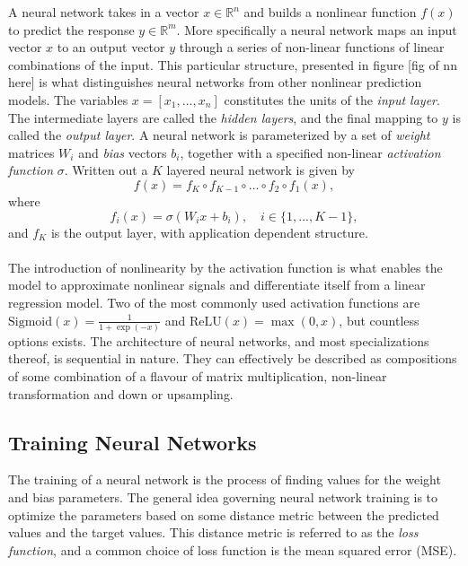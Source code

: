\documentclass[../../thesis.tex]{subfiles}
\begin{document}
A neural network takes in a vector $x \in \mathbb{R}^n$ and builds a nonlinear function $f(x)$ to predict the response $y\in \mathbb{R}^m$. More specifically a neural network maps an input vector $x$ to an output vector $y$ through a series of non-linear functions of linear combinations of the input. This particular structure, presented in figure [fig of nn here] is what distinguishes neural networks from other nonlinear prediction models. The variables $x = [x_1,...,x_n]$ constitutes the units of the \textit{input layer}. The intermediate layers are called the \textit{hidden layers}, and the final mapping to $y$ is called the \textit{output layer}. A neural network is parameterized by a set of \textit{weight} matrices $W_i$ and \textit{bias} vectors $b_i$, together with a specified non-linear \textit{activation function} $\sigma$. Written out a $K$ layered neural network is given by 
\[ 
f(x) = f_K \circ f_{K-1} \circ \ldots \circ f_2 \circ f_1(x),
\]
where 
$$f_i(x) = \sigma(W_ix+b_i), \quad i \in \{1,...,K-1\},$$ 
and $f_K$ is the output layer, with application dependent structure.\\\\ 

The introduction of nonlinearity by the activation function is what enables the model to approximate nonlinear signals and differentiate itself from a linear regression model. Two of the most commonly used activation functions are $\text{Sigmoid}(x) = \tfrac{1}{1+\exp(-x)}$ and $\text{ReLU}(x) = \max(0,x)$, but countless options exists.\newline
The architecture of neural networks, and most specializations thereof, is sequential in nature. They can effectively be described as compositions of some combination of a flavour of matrix multiplication, non-linear transformation and down or upsampling. 

\subsection{Training Neural Networks}

The training of a neural network is the process of finding values for the weight and bias parameters. The general idea governing neural network training is to optimize the parameters based on some distance metric between the predicted values and the target values. This distance metric is referred to as the \textit{loss function}, and a common choice of loss function is the mean squared error (MSE).\newline
\end{document}
